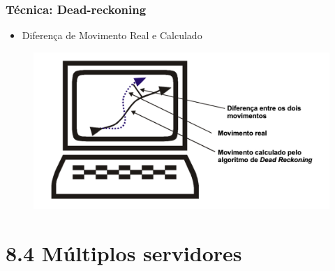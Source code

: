 \documentclass{beamer}
\begin{document}
\begin{frame}
  \frametitle{Técnica: Dead-reckoning}
  \begin{itemize}
    \item Diferença de Movimento Real e Calculado
  \end{itemize}
  \begin{figure}[h]
    \centering
    \vspace{-18pt}
    \includegraphics[width=1.03\textwidth]{imagem_DeadreckoningDiferenca.png}
    \vspace{-20pt}
  \end{figure}
  \begin{flushright}
    \scriptsize
    \cite{Eduardo2002}
  \end{flushright}
\end{frame}


\section{8.4 Múltiplos servidores}
\end{document}
